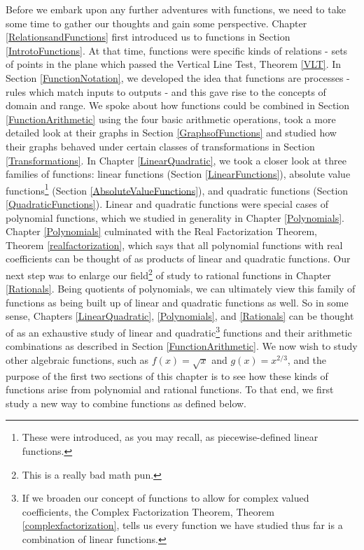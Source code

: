 

\setcounter{footnote}{0}

\label{FunctionComposition}

Before we embark upon any further adventures with functions, we need to take some time to gather our thoughts and gain some perspective.  Chapter \ref{RelationsandFunctions} first introduced us to functions in Section \ref{IntrotoFunctions}.  At that time, functions were specific kinds of relations - sets of points in the plane which passed the Vertical Line Test, Theorem \ref{VLT}.  In Section \ref{FunctionNotation}, we developed the idea that functions are processes - rules which match inputs to outputs - and this gave rise to the concepts of domain and range.  We spoke about how functions could be combined in Section \ref{FunctionArithmetic} using the four basic arithmetic operations, took a more detailed look at their graphs in Section \ref{GraphsofFunctions} and studied how their graphs behaved under certain classes of transformations in Section \ref{Transformations}.  In Chapter \ref{LinearQuadratic}, we took a closer look at three families of functions: linear functions (Section \ref{LinearFunctions}), absolute value functions\footnote{These were introduced, as you may recall, as piecewise-defined linear functions.} (Section \ref{AbsoluteValueFunctions}), and quadratic functions (Section \ref{QuadraticFunctions}).  Linear and quadratic functions were special cases of polynomial functions, which we studied in generality in Chapter \ref{Polynomials}. Chapter \ref{Polynomials} culminated with the Real Factorization Theorem, Theorem \ref{realfactorization}, which says that all polynomial functions with real coefficients can be thought of as products of linear and quadratic functions.  Our next step was to enlarge our field\footnote{This is a really bad math pun.} of study to rational functions in Chapter \ref{Rationals}.  Being quotients of polynomials, we can ultimately view this family of functions as being built up of linear and quadratic functions as well.  So in some sense, Chapters \ref{LinearQuadratic}, \ref{Polynomials}, and \ref{Rationals} can be thought of as an exhaustive study of linear and quadratic\footnote{If we broaden our concept of functions to allow for complex valued coefficients, the Complex Factorization Theorem, Theorem \ref{complexfactorization}, tells us every function we have studied thus far is a combination of linear functions.} functions and their arithmetic combinations as described in Section \ref{FunctionArithmetic}. We now wish to study other algebraic functions, such as $f(x) = \sqrt{x}$ and $g(x) = x^{2/3}$, and the purpose of the first two sections of this chapter is to see how these kinds of functions arise from polynomial and rational functions.  To that end, we first study a new way to combine functions as defined below.

